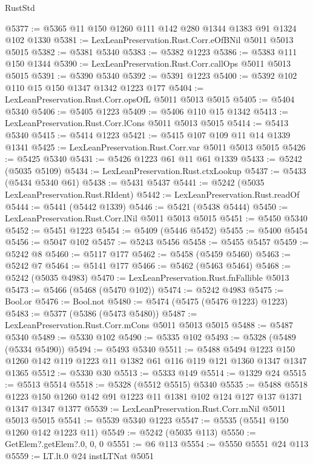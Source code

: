 \begin{lexlean}{RustStd}
\begin{coremodule}
{\begin{coremodule}
{{{{{{{{{{{{{{{{{{{{{{{{{{{{{{{{{{@5377 := @5365 @11 @150 @1260 @111 @142 @280 @1344 @1383 @91 @1324 @102 @1330
@5381 := LexLeanPreservation.Rust.Corr.eOfBNil @5011 @5013 @5015
@5382 := @5381 @5340
@5383 := @5382 @1223
@5386 := @5383 @111 @150 @1344
@5390 := LexLeanPreservation.Rust.Corr.callOps @5011 @5013 @5015
@5391 := @5390 @5340
@5392 := @5391 @1223
@5400 := @5392 @102 @110 @15 @150 @1347 @1342 @1223 @177
@5404 := LexLeanPreservation.Rust.Corr.opsOfL @5011 @5013 @5015
@5405 := @5404 @5340
@5406 := @5405 @1223
@5409 := @5406 @110 @15 @1342
@5413 := LexLeanPreservation.Rust.Corr.lCons @5011 @5013 @5015
@5414 := @5413 @5340
@5415 := @5414 @1223
@5421 := @5415 @107 @109 @11 @14 @1339 @1341
@5425 := LexLeanPreservation.Rust.Corr.var @5011 @5013 @5015
@5426 := @5425 @5340
@5431 := @5426 @1223 @61 @11 @61 @1339
@5433 := @5242 (@5035 @5109)
@5434 := LexLeanPreservation.Rust.ctxLookup
@5437 := @5433 (@5434 @5340 @61)
@5438 := @5431 @5437
@5441 := @5242 (@5035 LexLeanPreservation.Rust.RIdent)
@5442 := LexLeanPreservation.Rust.readOf
@5444 := @5441 (@5442 @1339)
@5446 := @5421 (@5438 @5444)
@5450 := LexLeanPreservation.Rust.Corr.lNil @5011 @5013 @5015
@5451 := @5450 @5340
@5452 := @5451 @1223
@5454 := @5409 (@5446 @5452)
@5455 := @5400 @5454
@5456 := @5047 @102
@5457 := @5243 @5456
@5458 := @5455 @5457
@5459 := @5242 @8
@5460 := @5117 @177
@5462 := @5458 (@5459 @5460)
@5463 := @5242 @7
@5464 := @5141 @177
@5466 := @5462 (@5463 @5464)
@5468 := @5242 (@5035 @4983)
@5470 := LexLeanPreservation.Rust.fnFallible @5013
@5473 := @5466 (@5468 (@5470 @102))
@5474 := @5242 @4983
@5475 := Bool.or
@5476 := Bool.not
@5480 := @5474 (@5475 (@5476 @1223) @1223)
@5483 := @5377 (@5386 (@5473 @5480))
@5487 := LexLeanPreservation.Rust.Corr.mCons @5011 @5013 @5015
@5488 := @5487 @5340
@5489 := @5330 @102
@5490 := @5335 @102
@5493 := @5328 (@5489 (@5334 @5490))
@5494 := @5493 @5340
@5511 := @5488
    @5494
    @1223
    @150
    @1260
    @142
    @119
    @1223
    @11
    @1382
    @61
    @116
    @119
    @121
    @1360
    @1347
    @1347
    @1365
@5512 := @5330 @30
@5513 := @5333 @149
@5514 := @1329 @24
@5515 := @5513 @5514
@5518 := @5328 (@5512 @5515) @5340
@5535 := @5488
    @5518
    @1223
    @150
    @1260
    @142
    @91
    @1223
    @11
    @1381
    @102
    @124
    @127
    @137
    @1371
    @1347
    @1347
    @1377
@5539 := LexLeanPreservation.Rust.Corr.mNil @5011 @5013 @5015
@5541 := @5539 @5340 @1223
@5547 := @5535 (@5541 @150 @1260 @142 @1223 @11)
@5549 := @5242 (@5035 @113)
@5550 := GetElem?.getElem?.{0, 0, 0}
@5551 := @6 @113
@5554 := @5550 @5551 @24 @113
@5559 := LT.lt.{0} @24 instLTNat @5051
}}}}}}}}}}}}}}}}}}}}}}}}}}}}}}}}}}
\end{coremodule}}
\end{coremodule}
\end{lexlean}
